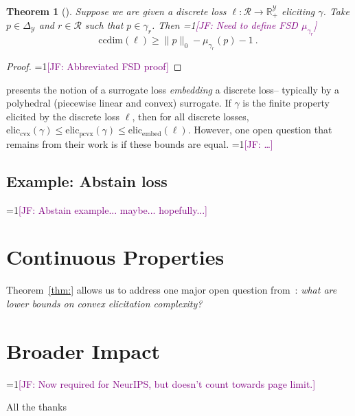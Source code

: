 \documentclass{article}
\newcommand{\Comments}{1}
\newcommand{\mynote}[2]{\ifnum\Comments=1\textcolor{#1}{#2}\fi}
\newcommand{\jessie}[1]{\mynote{purple}{[JF: #1]}}
\newcommand{\reals}{\mathbb{R}}
\newcommand{\simplex}{\Delta_\Y}
\newcommand{\eliccvx}{\mathrm{elic}_\mathrm{cvx}}
\newcommand{\elicpoly}{\mathrm{elic}_\mathrm{pcvx}}
\newcommand{\elicembed}{\mathrm{elic}_\mathrm{embed}}
\newcommand{\ccdim}{\mathrm{ccdim}}
\newcommand{\R}{\mathcal{R}}
\newcommand{\Y}{\mathcal{Y}}
\newtheorem{theorem}{Theorem}
\begin{document}
\begin{theorem}[\cite{ramaswamy2016convex}]
	Suppose we are given a discrete loss $\ell:\R \to \reals^\Y_+$ eliciting $\gamma$.
	Take $p \in \simplex$ and $r \in \R$ such that $p \in \gamma_r$.
	Then \jessie{Need to define FSD $\mu_{\gamma_r}$}
	\begin{equation}
	\ccdim(\ell) \geq \|p\|_0 - \mu_{\gamma_r}(p) - 1~.~
	\end{equation}
\end{theorem}
\begin{proof}
	\jessie{Abbreviated FSD proof}
\end{proof}

\cite{finocchiaro2019embedding} presents the notion of a surrogate loss \emph{embedding} a discrete loss-- typically by a polyhedral (piecewise linear and convex) surrogate.
If $\gamma$ is the finite property elicited by the discrete loss $\ell$, then for all discrete losses, $\eliccvx(\gamma) \leq \elicpoly(\gamma) \leq \elicembed(\ell)$.
However, one open question that remains from their work is if these bounds are equal. \jessie{\ldots} 

\subsection{Example: Abstain loss}
\jessie{Abstain example... maybe... hopefully...}

\section{Continuous Properties}
Theorem~\ref{thm:} allows us to address one major open question from~\cite{frongillo2015elicitation}: \emph{what are lower bounds on convex elicitation complexity?}


\newpage

\section*{Broader Impact}
\jessie{Now required for NeurIPS, but doesn't count towards page limit.}

\begin{ack}
All the thanks
\end{ack}



\end{document}
